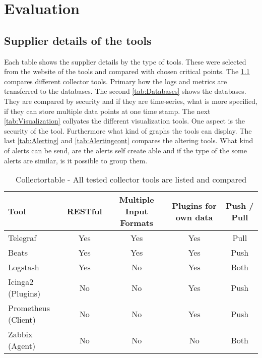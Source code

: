 \chapter{Evaluation} %
\section{Supplier details of the tools}
Each table shows the supplier details by the type of tools. These were selected from the website of the tools and compared with chosen critical points. The \cref{tab:Collector} compares different collector tools. Primary how the logs and metrics are transferred to the databases. The second \cref{tab:Databases} shows the databases. They are compared by security and if they are time-series, what is more specified, if they can store multiple data points at one time stamp. The next \cref{tab:Visualization} collyates the different visualization tools. One aspect is the security of the tool. Furthermore what kind of graphs the tools can display. The last \cref{tab:Alerting} and \cref{tab:Alertingcont} compares the altering tools. What kind of alerts can be send, are the alerts self create able and if the type of the some alerts are similar, is it possible to group them. 

\begin{table}
\centering
\begin{tabular}{p{3cm}cccc}
\hline
Tool & RESTful                     & Multiple Input Formats      & Plugins for own data        & Push / Pull                 \\
\hline
Telegraf                     & Yes & Yes                         & Yes                         & Pull                         \\
Beats                        & Yes                         & Yes & Yes                         & Push                         \\
Logstash                     & Yes                         & No                          & Yes & Both                         \\
Icinga2 (Plugins)            & No                          & No                          & Yes                         & Push \\
Prometheus (Client)          & No                          & No                          & Yes                         & Push \\
Zabbix (Agent)               & No                          & No                          & No  & Both \\
\hline                        
\end{tabular}
\caption{Collectortable - All tested collector tools are listed and compared}
\label{tab:Collector}
\end{table}


